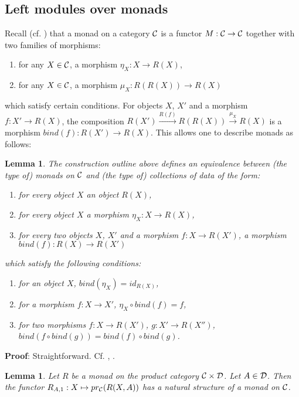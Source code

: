 \documentclass[11pt]{article}
\newenvironment{proof}{{\bf Proof}:}{\vskip 5mm }
\newtheorem{lemma}[proposition]{Lemma}
\newcommand{\llabel}[1]{\label{#1}}
\newcommand{\sr}{\rightarrow}
\begin{document}
\subsection{Left modules over monads}
%
Recall (cf. \cite{HM2007}) that a monad on a category $\cal C$ is a functor $M:{\cal C}\sr {\cal C}$ together with two families of morphisms:
%
\begin{enumerate}
\item for any $X\in {\cal C}$, a morphism $\eta_X:X \sr R(X)$,
\item for any $X\in {\cal C}$, a morphism $\mu_X:R(R(X))\sr R(X)$
\end{enumerate}
%
which satisfy certain conditions. For objects $X$, $X'$ and a morphism $f:X'\sr R(X)$, the composition $R(X') \stackrel{R(f)}{\sr} R(R(X))\stackrel{\mu_X}{\sr} R(X)$ is a morphism  $bind(f):R(X')\sr R(X)$. This allows one to describe monads as follows:
%
\begin{lemma}
\llabel{2014.06.30.l1}
The construction outline above defines an equivalence between (the type of)  monads  on $\cal C$ and (the type of) collections of data of the form:
%
\begin{enumerate}
\item for every object $X$ an object $R(X)$,
\item for every object $X$ a morphism $\eta_X: X \sr R(X)$,
\item for every two objects $X$, $X'$ and a morphism $f:X\sr R(X')$, a morphism $ bind(f):R(X)\sr R(X')$
\end{enumerate}
%
%
which satisfy the following conditions:
%
\begin{enumerate}
\item for an object $X$, $ bind(\eta_X)=id_{R(X)}$,
\item for a morphism $f:X\sr X'$, $\eta_X\circ bind(f)=f$,
\item for two morphisms $f:X\sr R(X')$, $g:X'\sr R(X'')$, $ bind(f \circ bind(g))= bind(f)\circ bind(g)$.
\end{enumerate}
%
\end{lemma}
%
\begin{proof}
Straightforward. Cf. \cite{Moggi91}, \cite[Prop. 1]{HM2010}.
\end{proof}
%
\begin{lemma}
\llabel{2014.07.28.l2}
Let $R$ be a monad on the product category ${\cal C}\times {\cal D}$. Let $A\in {\cal D}$. Then the functor $R_{A,1}:X\mapsto pr_{\cal C}(R(X,A))$ has a natural structure of a monad on $\cal C$.
\end{lemma}
\end{document}
